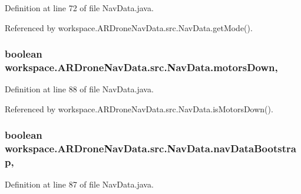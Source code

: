 Definition at line 72 of file Nav\+Data.\+java.



Referenced by workspace.\+A\+R\+Drone\+Nav\+Data.\+src.\+Nav\+Data.\+get\+Mode().

\hypertarget{classworkspace_1_1_a_r_drone_nav_data_1_1src_1_1_nav_data_a7dc12d057a146840a0d9a50a825c41dd}{}
\subsubsection[{motors\+Down}]{\setlength{\rightskip}{0pt plus 5cm}boolean workspace.\+A\+R\+Drone\+Nav\+Data.\+src.\+Nav\+Data.\+motors\+Down\hspace{0.3cm}{\ttfamily [static]}, {\ttfamily [protected]}}\label{classworkspace_1_1_a_r_drone_nav_data_1_1src_1_1_nav_data_a7dc12d057a146840a0d9a50a825c41dd}


Definition at line 88 of file Nav\+Data.\+java.



Referenced by workspace.\+A\+R\+Drone\+Nav\+Data.\+src.\+Nav\+Data.\+is\+Motors\+Down().

\hypertarget{classworkspace_1_1_a_r_drone_nav_data_1_1src_1_1_nav_data_acac94390b9dabe7f46faf6d1b0d0692a}{}
\subsubsection[{nav\+Data\+Bootstrap}]{\setlength{\rightskip}{0pt plus 5cm}boolean workspace.\+A\+R\+Drone\+Nav\+Data.\+src.\+Nav\+Data.\+nav\+Data\+Bootstrap\hspace{0.3cm}{\ttfamily [static]}, {\ttfamily [protected]}}\label{classworkspace_1_1_a_r_drone_nav_data_1_1src_1_1_nav_data_acac94390b9dabe7f46faf6d1b0d0692a}


Definition at line 87 of file Nav\+Data.\+java.



